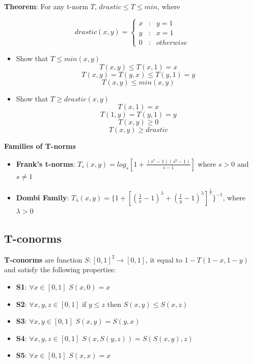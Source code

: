 \documentclass{article}
\begin{document}
\textbf{Theorem}: For any t-norm $T$, $drastic \leq T \leq min$, where 

\begin{equation}
    drastic(x, y) = \left\{\begin{matrix} x & : & y = 1\\ y & : & x = 1\\ 0 & : & otherwise \end{matrix}\right.
\end{equation}

\begin{itemize}
    \item Show that $T \leq min(x, y)$
    $$T(x, y) \leq T(x, 1) = x$$
    $$T(x, y) = T(y, x) \leq T(y, 1) = y $$
    $$T(x, y) \leq min(x, y)$$
    \item Show that $T \geq drastic(x, y)$
    $$T(x, 1) = x$$
    $$T(1, y) = T(y, 1) = y$$
    $$T(x, y) \geq 0$$
    $$T(x, y) \geq drastic$$
\end{itemize}

\textbf{Families of T-norms}

\begin{itemize}
    \item \textbf{Frank’s t-norms}: $T_s(x, y) = log_s[1 + \frac{(s^x-1)(s^y-1)}{s-1}]$ where $s > 0$ and $s \neq 1$
    \item \textbf{Dombi Family}: $T_{\lambda}(x, y) = \{ 1 + [(\frac{1}{x} - 1)^{\lambda} + (\frac{1}{y} - 1)^{\lambda}]^{\frac{1}{\lambda}} \}^{-1}$, where $\lambda > 0$
\end{itemize}


\subsection{T-conorms}

\textbf{T-conorms} are function $S: [0, 1]^2 \rightarrow [0, 1]$, it equal to $1 - T(1-x, 1-y)$ and satisfy the following properties:

\begin{itemize}
    \item \textbf{S1}: $\forall x \in [0, 1]$ $S(x, 0) = x$
    \item \textbf{S2}: $\forall x, y, z \in [0, 1]$ if $y \leq z$ then $S(x, y) \leq S(x, z)$
    \item \textbf{S3}: $\forall x, y \in [0, 1]$ $S(x, y) = S(y, x)$
    \item \textbf{S4}: $\forall x, y, z \in [0, 1]$ $S(x, S(y, z)) = S(S(x, y), z)$
    \item \textbf{S5}: $\forall x \in [0, 1]$ $S(x, x) = x$
\end{itemize}
\end{document}
